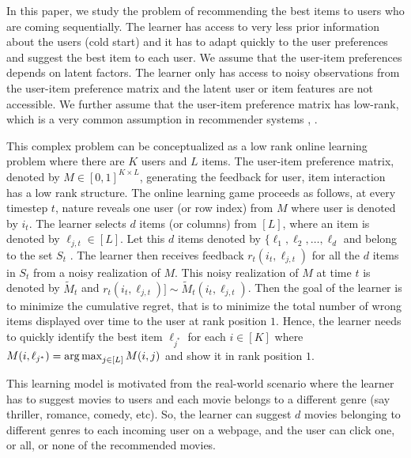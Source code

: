In this paper, we study the problem of recommending the best items to users who are coming sequentially. The learner has access to very less prior information about the users (cold start) and it has to adapt quickly to the user preferences and suggest the best item to each user. We assume that the user-item preferences depends on latent factors. The learner only has access to noisy observations from the user-item preference matrix and the latent user or item features are not accessible. We further assume that the user-item preference matrix has low-rank, which is a very common assumption in recommender systems \citep{koren2009matrix}, \citep{ricci2011liorrokach}. %

	This complex problem can be conceptualized as a low rank online learning  problem where there are $K$ users and $L$ items. The user-item preference  matrix, denoted by $M\in [0,1]^{K\times L}$,  generating the feedback for user, item interaction has a low rank structure. The online learning game proceeds as follows, at every timestep $t$,  nature reveals one user (or row index)   from $M$ where user is denoted by $i_t$. The learner selects $d$ items (or columns) from $[L]$, where an item is denoted by $\ell _{j, t}\in [L]$. Let this $d$ items denoted by $\lbrace \ell_{1}, \ell_2, \dots, \ell_d$ and belong to the set $S_t$ . The learner then receives feedback $r_{t}(i_t,\ell_{j,t})$ for all the $d$ items in $S_t$ from a noisy realization of $M$. This noisy realization of $M$ at time $t$ is denoted by $\tilde{M}_t$ and  $r_{t}(i_t,\ell_{j,t})] \sim \tilde{M}_t(i_t,\ell_{j,t})$. Then the goal of the learner is to minimize the cumulative regret, that is to minimize the total number of wrong items displayed over time to the user at rank position $1$. Hence, the learner needs to quickly identify the best item $\ell_{j^*}$ for each $i\in [K]$ where $M(i,\ell_{j^*}) = \mathop{\rm arg\,max} _{j\in[L]} M(i,j)$ and show it in rank position $1$. 
	

	This learning model is motivated from the real-world scenario where the learner has  to suggest movies to users and each movie belongs to a different genre (say thriller, romance, comedy, etc). So, the learner can suggest $d$ movies belonging to different genres to each incoming user on a webpage, and the user can click one, or all, or none of the recommended movies. 	
	
	
